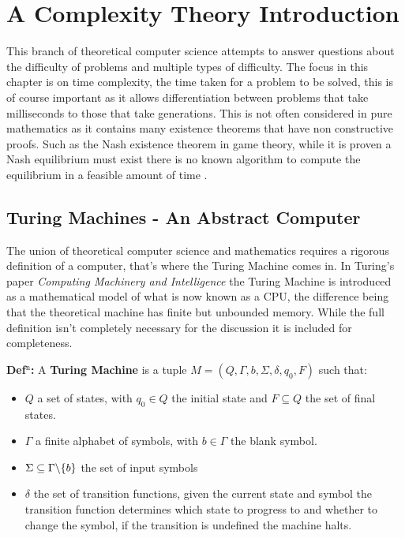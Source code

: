 \documentclass[a4paper,11pt]{report}
\begin{document}
\section{A Complexity Theory Introduction}

This branch of theoretical computer science attempts to answer questions about the difficulty of problems and multiple types of difficulty. The focus in this chapter is on time complexity, the time taken for a problem to be solved, this is of course important as it allows differentiation between problems that take milliseconds to those that take generations. This is not often considered in pure mathematics as it contains many existence theorems that have non constructive proofs. Such as the Nash existence theorem in game theory, while it is proven a Nash equilibrium must exist there is no known algorithm to compute the equilibrium in a feasible amount of time \cite{ppad}.

\subsection{Turing Machines - An Abstract Computer}

The union of theoretical computer science and mathematics requires a rigorous definition of a computer, that's where the Turing Machine comes in. In Turing's paper \textit{Computing Machinery and Intelligence} \cite{turing} the Turing Machine is introduced as a mathematical model of what is now known as a CPU, the difference being that the theoretical machine has finite but unbounded memory. While the full definition isn't completely necessary for the discussion it is included for completeness.

\textbf{Def$^\text{n}$:} A \textbf{Turing Machine} is a tuple $M=(Q,\Gamma,b,\Sigma, \delta, q_0, F)$ such that:
\begin{itemize}
\item $Q$ a set of states, with $q_0\in Q$ the initial state and $F\subseteq Q$ the set of final states.
\item $\Gamma$ a finite alphabet of symbols, with $b\in \Gamma$ the blank symbol.
\item $\Sigma\subseteq \Gamma \symbol{92} \{b\}$ the set of input symbols
\item $\delta$ the set of transition functions, given the current state and symbol the transition function determines which state to progress to and whether to change the symbol, if the transition is undefined the machine halts.
\end{itemize}
\end{document}
